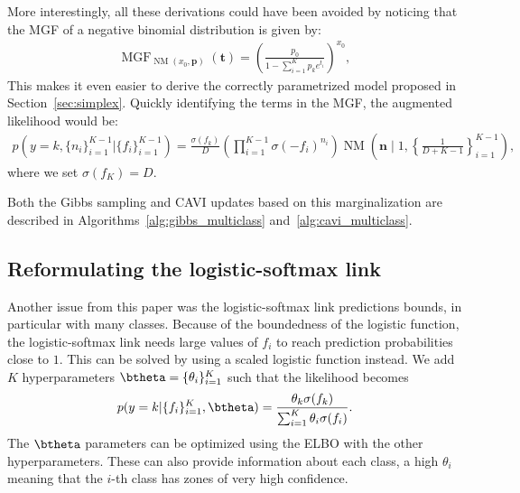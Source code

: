More interestingly, all these derivations could have been avoided by noticing that the \ac{MGF} of a negative binomial distribution is given by:
\begin{align*}
    \operatorname{MGF}_{\operatorname{NM}(x_0,\boldsymbol{p})}(\boldsymbol{t}) = \left(\frac{p_0}{1-\sum_{i=1}^K p_k e^{t_i}}\right)^{x_0},
\end{align*}
This makes it even easier to derive the correctly parametrized model proposed in Section~\ref{sec:simplex}.
Quickly identifying the terms in the \ac{MGF}, the augmented likelihood would be:
\begin{align*}
    p\left(y=k,\{n_i\}_{i=1}^{K-1}|\{f_i\}_{i=1}^{K-1}\right) = \frac{\sigma(f_k)}{D}\left(\prod_{i=1}^{K-1}\sigma(-f_i)^{n_i}\right)\operatorname{NM}\left(\boldsymbol{n}\mid 1, \left\{\frac{1}{D+K-1}\right\}_{i=1}^{K-1}\right),
\end{align*}
where we set $\sigma(f_K) = D$.

Both the Gibbs sampling and \ac{CAVI} updates based on this marginalization are described in Algorithms~\ref{alg:gibbs_multiclass} and~\ref{alg:cavi_multiclass}.

\subsection{Reformulating the logistic-softmax link}
\label{sec:scale_multiclass}
Another issue from this paper was the logistic-softmax link predictions bounds, in particular with many classes.
Because of the boundedness of the logistic function, the logistic-softmax link needs large values of $f_i$ to reach prediction probabilities close to $1$.
This can be solved by using a scaled logistic function instead.
We add $K$ hyperparameters $\btheta=\{\theta_{i}\}_{i=1}^K$ such that the likelihood becomes
\begin{align*}
    p(y=k|\{f_i\}_{i=1}^K,\btheta) = \frac{\theta_k \sigma(f_k)}{\sum_{i=1}^K \theta_i \sigma(f_i)}.
\end{align*}
The $\btheta$ parameters can be optimized using the \ac{ELBO} with the other hyperparameters.
These can also provide information about each class, a high $\theta_i$ meaning that the $i$-th class has zones of very high confidence.

